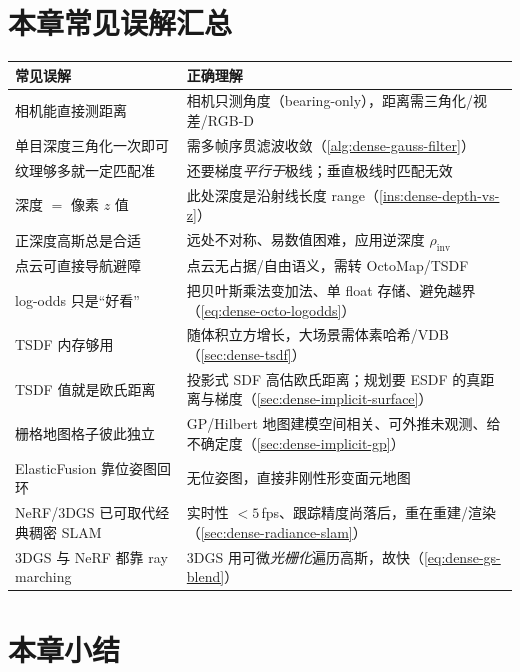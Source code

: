 \section*{本章常见误解汇总}
\begin{table}[H]\centering\small
\begin{tabular}{p{} p{}}
\toprule
\textbf{常见误解} & \textbf{正确理解} \\
\midrule
相机能直接测距离 & 相机只测角度（bearing-only），距离需三角化/视差/RGB-D \\
单目深度三角化一次即可 & 需多帧序贯滤波收敛（\cref{alg:dense-gauss-filter}）\\
纹理够多就一定匹配准 & 还要梯度\emph{平行于}极线；垂直极线时匹配无效 \\
深度 $=$ 像素 $z$ 值 & 此处深度是沿射线长度 range（\cref{ins:dense-depth-vs-z}）\\
正深度高斯总是合适 & 远处不对称、易数值困难，应用逆深度 $\rho_{\mathrm{inv}}$ \\
点云可直接导航避障 & 点云无占据/自由语义，需转 OctoMap/TSDF \\
log-odds 只是“好看” & 把贝叶斯乘法变加法、单 float 存储、避免越界（\cref{eq:dense-octo-logodds}）\\
TSDF 内存够用 & 随体积立方增长，大场景需体素哈希/VDB（\cref{sec:dense-tsdf}）\\
TSDF 值就是欧氏距离 & 投影式 SDF 高估欧氏距离；规划要 ESDF 的真距离与梯度（\cref{sec:dense-implicit-surface}）\\
栅格地图格子彼此独立 & GP/Hilbert 地图建模空间相关、可外推未观测、给不确定度（\cref{sec:dense-implicit-gp}）\\
ElasticFusion 靠位姿图回环 & 无位姿图，直接非刚性形变面元地图 \\
NeRF/3DGS 已可取代经典稠密 SLAM & 实时性 $<5$\,fps、跟踪精度尚落后，重在重建/渲染（\cref{sec:dense-radiance-slam}）\\
3DGS 与 NeRF 都靠 ray marching & 3DGS 用可微\emph{光栅化}遍历高斯，故快（\cref{eq:dense-gs-blend}）\\
\bottomrule
\end{tabular}
\end{table}

\section*{本章小结}

